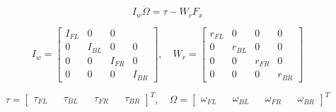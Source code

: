 
\begin{equation}
I_w\dot\Omega =
\tau-W_rF_x
\end{equation}

\begin{equation*}
 I_w =   \begin{bmatrix}
I_{FL} & 0 & 0 & \\ 
 0 & I_{BL}  & 0 & 0 \\ 
 0 &  0 & I_{FR} & 0\\ 
 0 &  0 &  0 & I_{BR}
\end{bmatrix}
,\quad
W_r=\begin{bmatrix}
r_{FL} & 0 & 0 & 0\\ 
0 & r_{BL} & 0 &0 \\ 
0 & 0 & r_{FR} & 0\\ 
0 & 0 & 0 & r_{BR}
\end{bmatrix}
\end{equation*}

\begin{equation*}
\tau = \begin{bmatrix}
\tau _{FL}&& 
\tau _{BL}&& 
\tau _{FR}&& 
\tau _{BR}
\end{bmatrix}^T
,\quad
\Omega =\begin{bmatrix}
\omega _ {FL}&& 
\omega _ {BL}&& 
\omega _ {FR}&& 
\omega _ {BR}
\end{bmatrix}^T
\end{equation*}




